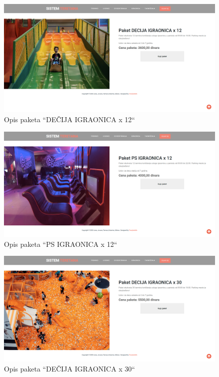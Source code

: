 \documentclass[../main.tex]{subfiles}
\begin{document}
\begin{figure}[!ht]
\begin{center}
\includegraphics[scale=0.22]{sections/korisnicki_interfejs/screenshots/decja_igraonica_12_termina.png}
\end{center}
\caption{Opis paketa ``DEČIJA IGRAONICA x 12``}
\label{fig:decijax12}
\end{figure}

\begin{figure}[!ht]
\begin{center}
\includegraphics[scale=0.22]{sections/korisnicki_interfejs/screenshots/ps_igraonica_12_termina.png}
\end{center}
\caption{Opis paketa ``PS IGRAONICA x 12``}
\label{fig:psx12}
\end{figure}

\begin{figure}[!ht]
\begin{center}
\includegraphics[scale=0.22]{sections/korisnicki_interfejs/screenshots/decja_igraonica_30_termina.png}
\end{center}
\caption{Opis paketa ``DEČIJA IGRAONICA x 30``}
\label{fig:decijax30}
\end{figure}
\end{document}
